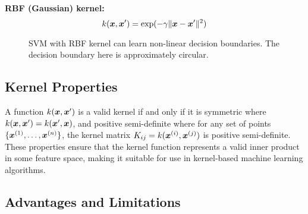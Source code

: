 \textbf{RBF (Gaussian) kernel:}
\begin{equation}
k(\boldsymbol{x}, \boldsymbol{x}') = \exp(-\gamma \|\boldsymbol{x} - \boldsymbol{x}'\|^2)
\end{equation}

\begin{figure}[htbp]
\centering
{}
\caption{SVM with RBF kernel can learn non-linear decision boundaries. The decision boundary here is approximately circular.}
\label{fig:svm-rbf-kernel}
\end{figure}

\subsection{Kernel Properties}

A function $k(\boldsymbol{x}, \boldsymbol{x}')$ is a valid kernel if and only if it is symmetric where $k(\boldsymbol{x}, \boldsymbol{x}') = k(\boldsymbol{x}', \boldsymbol{x})$, and positive semi-definite where for any set of points $\{\boldsymbol{x}^{(1)}, \ldots, \boldsymbol{x}^{(n)}\}$, the kernel matrix $K_{ij} = k(\boldsymbol{x}^{(i)}, \boldsymbol{x}^{(j)})$ is positive semi-definite. These properties ensure that the kernel function represents a valid inner product in some feature space, making it suitable for use in kernel-based machine learning algorithms.

\subsection{Advantages and Limitations}

